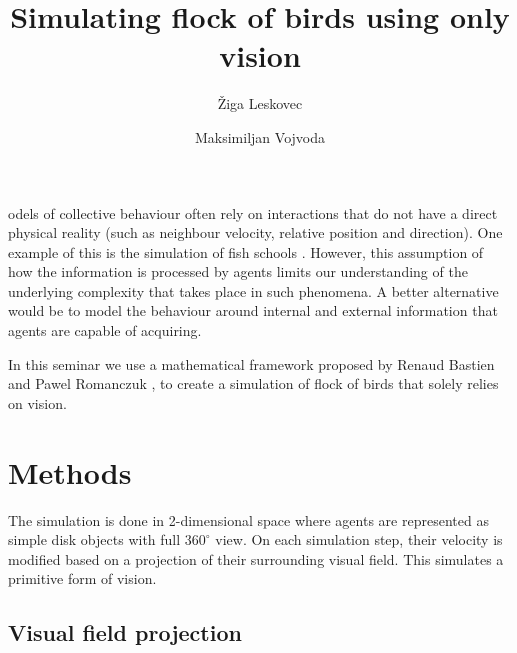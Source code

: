 \documentclass[9pt]{pnas-new}
\title{Simulating flock of birds using only vision}
\author{Žiga Leskovec}
\author{Maksimiljan Vojvoda}
\affil{Collective behaviour course research seminar report}
\begin{document}
\verticaladjustment{-2pt}

\maketitle
\thispagestyle{firststyle}

odels of collective behaviour often rely on interactions that do not have a direct physical reality (such as neighbour velocity, relative position and direction).
One example of this is the simulation of fish schools \cite{wissel1992fish}.
However, this assumption of how the information is processed by agents limits our understanding of the underlying complexity that takes place in such phenomena.
A better alternative would be to model the behaviour around internal and external information that agents are capable of acquiring.

In this seminar we use a mathematical framework proposed by Renaud Bastien and Pawel Romanczuk \cite{main-paper}, to create a simulation of flock of birds that solely relies on vision.




























\section*{Methods}

The simulation is done in 2-dimensional space where agents are represented as simple disk objects with full $360^\circ$ view.
On each simulation step, their velocity is modified based on a projection of their surrounding visual field.
This simulates a primitive form of vision.



\subsection{Visual field projection}
\end{document}
